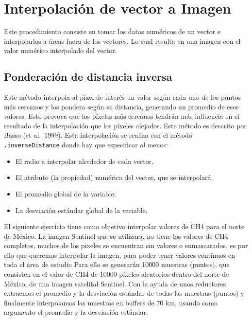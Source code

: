 \documentclass[
  12pt,
  letterpaper,
  twoside]{book}
\providecommand{\tightlist}{%
  \setlength{\itemsep}{0pt}\setlength{\parskip}{0pt}}
\begin{document}
\hypertarget{interpolaciuxf3n-de-vector-a-imagen}{%
\section{Interpolación de vector a Imagen}\label{interpolaciuxf3n-de-vector-a-imagen}}

Este procedimiento consiste en tomar los datos numéricos de un vector e interpolarlos a áreas fuera de los vectores. Lo cual resulta en una imagen con el valor numérico interpolado del vector.

\hypertarget{ponderaciuxf3n-de-distancia-inversa}{%
\subsection*{Ponderación de distancia inversa}\label{ponderaciuxf3n-de-distancia-inversa}}

Este método interpola al píxel de interés un valor según cada uno de los puntos más cercanos y los pondera según su distancia, generando un promedio de esos valores. Esto provoca que los píxeles más cercanos tendrán más influencia en el resultado de la interpolación que los píxeles alejados. Este método es descrito por Basso (et al.~1999). Esta interpolación se realiza con el método \texttt{.inverseDistance} donde hay que especificar al menos:

\begin{itemize}
\tightlist
\item
  El radio a interpolar alrededor de cada vector.
\item
  El atributo (la propiedad) numérica del vector, que se interpolará.
\item
  El promedio global de la variable.
\item
  La desviación estándar global de la variable.
\end{itemize}

El siguiente ejercicio tiene como objetivo interpolar valores de CH4 para el norte de México.
La imagen Sentinel que se utilizara, no tiene los valores de CH4 completos, muchos de los pixeles se encuentran sin valores o enmascarados, es por ello que queremos interpolar la imagen, para poder tener valores continuos en toda el área de estudio
Para ello se generarán 10000 muestras (puntos), que consisten en el valor de CH4 de 10000 píxeles aleatorios dentro del norte de México, de una imagen satelital Sentinel.
Con la ayuda de unos reductores extraemos el promedio y la desviación estándar de todas las muestras (puntos)
y finalmente interpolamos las muestras en buffers de 70 km, usando como argumento el promedio y la desviación estándar.
\end{document}
